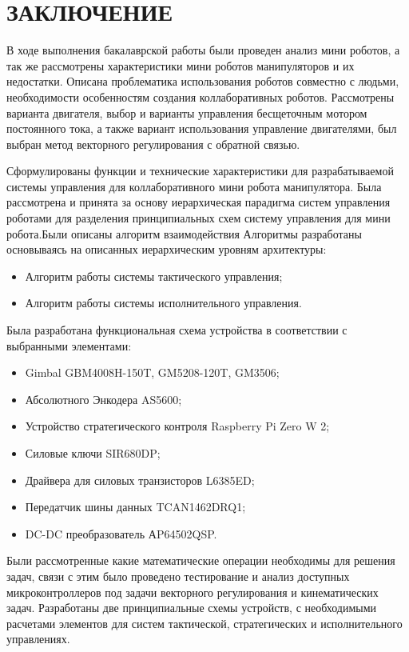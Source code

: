 
\section*{\centering ЗАКЛЮЧЕНИЕ}

В ходе выполнения бакалаврской работы были проведен анализ мини роботов, а так же рассмотрены характеристики  мини роботов манипуляторов и их недостатки. Описана проблематика использования роботов совместно с людьми, необходимости особенностям создания коллаборативных роботов. 
Рассмотрены варианта двигателя, выбор и варианты управления бесщеточным мотором постоянного тока, а также вариант использования управление двигателями, был выбран метод векторного регулирования с обратной связью.

Сформулированы функции и технические характеристики для разрабатываемой системы управления для коллаборативного мини робота манипулятора. Была рассмотрена и принята за основу иерархическая парадигма систем управления роботами для разделения принципиальных схем систему управления для мини робота.Были описаны алгоритм взаимодействия%
Алгоритмы разработаны основываясь на описанных иерархическим уровням архитектуры:
\begin{itemize}
	\item Алгоритм работы системы тактического управления;
	\item Алгоритм работы системы исполнительного управления.
\end{itemize}
Была разработана функциональная схема устройства в соответствии с выбранными элементами:
\begin{itemize}
	\item Gimbal GBM4008H-150T, GM5208-120T, GM3506;
	\item Абсолютного Энкодера AS5600;
	\item Устройство стратегического контроля Raspberry Pi Zero W 2;
	\item Силовые ключи SIR680DP;
	\item Драйвера для силовых транзисторов L6385ED;
	\item Передатчик шины данных TCAN1462DRQ1;
	\item DC-DC преобразователь АP64502QSP.
\end{itemize}
Были рассмотренные какие математические операции необходимы для решения задач, связи с этим было проведено тестирование и анализ доступных микроконтроллеров под задачи векторного регулирования и кинематических задач. Разработаны две принципиальные схемы устройств, с необходимыми расчетами элементов для систем тактической, стратегических и исполнительного управлениях.
